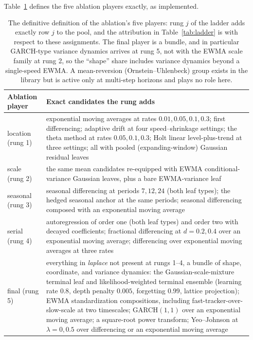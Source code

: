 \documentclass[11pt]{article}
\theoremstyle{remark}
\begin{document}
Table~\ref{tab:grammar} defines the five ablation players exactly, as implemented.

\begin{table}[t]
\centering
\small
\begin{tabular}{lp{}}
\toprule
Ablation player & Exact candidates the rung adds\\
\midrule
location (rung 1) & exponential moving averages at rates $0.01,0.05,0.1,0.3$; first
differencing; adaptive drift at four speed--shrinkage settings; the theta method at rates
$0.05,0.1,0.3$; Holt linear level-plus-trend at three settings; all with pooled
(expanding-window) Gaussian residual leaves\\
scale (rung 2) & the same mean candidates re-equipped with EWMA conditional-variance Gaussian
leaves, plus a bare EWMA-variance leaf\\
seasonal (rung 3) & seasonal differencing at periods $7,12,24$ (both leaf types); the hedged
seasonal anchor at the same periods; seasonal differencing composed with an exponential
moving average\\
serial (rung 4) & autoregression of order one (both leaf types) and order two with decayed
coefficients; fractional differencing at $d=0.2,0.4$ over an exponential moving average;
differencing over exponential moving averages at three rates\\
final (rung 5) & everything in \emph{laplace} not present at rungs 1--4, a bundle of shape,
coordinate,
and variance dynamics: the Gaussian-scale-mixture terminal leaf and likelihood-weighted
terminal ensemble (learning rate $0.8$, depth penalty $0.005$, forgetting $0.99$, lattice
projection); EWMA standardization compositions, including fast-tracker-over-slow-scale at two
timescales; GARCH$(1,1)$ over an exponential moving average; a square-root power transform;
Yeo--Johnson at $\lambda=0,0.5$ over differencing or an exponential moving average\\
\bottomrule
\end{tabular}
\caption{The definitive definition of the ablation's five players: rung $j$ of the ladder
adds exactly row $j$ to the pool, and the attribution in Table~\ref{tab:ladder} is with
respect to these assignments. The final player is a bundle, and in particular GARCH-type
variance
dynamics arrives at rung 5, not with the EWMA scale family at rung 2, so the ``shape'' share
includes variance dynamics beyond a single-speed EWMA. A mean-reversion
(Ornstein--Uhlenbeck) group exists in the library but is active only at multi-step horizons
and plays no role here.}
\label{tab:grammar}
\end{table}
\end{document}
